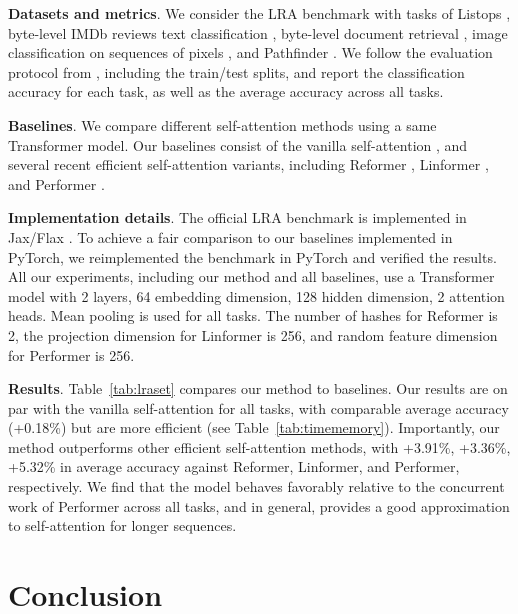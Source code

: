 \smallskip
 \textbf{Datasets and metrics}. We consider the LRA benchmark \cite{tay2020long} with tasks of Listops \cite{nangia2018listops}, byte-level IMDb reviews text classification \cite{maas2011learning}, byte-level document retrieval \cite{radev2013acl}, image classification on sequences of pixels  \cite{krizhevsky2009learning}, and Pathfinder \cite{linsley2018learning}. We follow the evaluation protocol from \cite{tay2020long}, including the train/test splits, and report the classification accuracy for each task, as well as the average accuracy across all tasks.

\smallskip
 \textbf{Baselines}. We compare different self-attention methods using a same Transformer model. Our baselines consist of the vanilla self-attention \cite{vaswani2017attention}, and several recent efficient self-attention variants, including Reformer \cite{kitaev2019reformer}, Linformer \cite{wang2020linformer}, and Performer \cite{choromanski2020rethinking}. 

\smallskip
 \textbf{Implementation details}. The official LRA benchmark \cite{tay2020long} is implemented in Jax/Flax \cite{frostig2018compiling}. To achieve a fair comparison to our baselines implemented in PyTorch, we reimplemented the benchmark in PyTorch and verified the results. All our experiments, including our method and all baselines, use a Transformer model with 2 layers, 64 embedding dimension, 128 hidden dimension, 2 attention heads. Mean pooling is used for all tasks. The number of hashes for Reformer is 2, the projection dimension for Linformer is 256, and random feature dimension for Performer is 256.

\smallskip
 \textbf{Results}. Table~\ref{tab:lraset} compares our method to baselines. Our results are on par with the vanilla self-attention for all tasks, with comparable average accuracy (+0.18\%) but are more efficient (see Table~\ref{tab:timememory}). Importantly, our method outperforms other efficient self-attention methods, with +3.91\%, +3.36\%, +5.32\% in average accuracy against Reformer, Linformer, and Performer, respectively. We find that the model behaves favorably relative to the concurrent work of Performer across all tasks, and in general, provides a good approximation to self-attention for longer sequences. 

\section{Conclusion}

